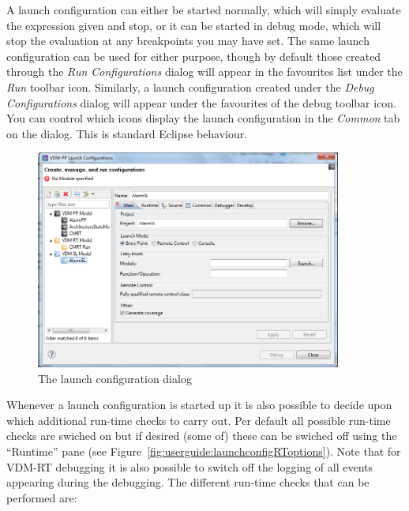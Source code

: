 \documentclass{overturerepchap}
\begin{document}
A launch configuration can either be started normally, which will simply evaluate
the expression given and stop, or it can be started in debug mode, which will
stop the evaluation at any breakpoints you may have set. The same launch configuration
can be used for either purpose, though by default those created through the
\emph{Run Configurations} dialog will appear in the favourites list under the
\emph{Run} toolbar icon. Similarly, a launch configuration created under the
\emph{Debug Configurations} dialog will appear under the favourites of the
debug toolbar icon. You can control which icons display the launch configuration
in the \emph{Common} tab on the dialog. This is standard Eclipse behaviour.


\begin{figure}[htp]
\begin{center}
  \includegraphics[width=380px]{screenDumps/launchconfig}
  \caption{The launch configuration dialog}
  \label{fig:userguide:launchconfig}
\end{center}
\end{figure}

Whenever a launch configuration is started up it is also possible to
decide upon which additional run-time checks to carry out. Per default
all possible run-time checks are swiched on but if desired (some of)
these can be swiched off using the ``Runtime'' pane (see
Figure~\ref{fig:userguide:launchconfigRToptions}). Note that for
VDM-RT debugging it is also possible to switch off the logging of all
events appearing during the debugging. The different run-time checks
that can be performed are:
\end{document}
